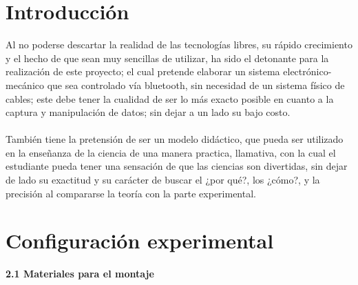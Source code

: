 \documentclass[12]{article}
\begin{document}
\begin{multicols}{2}
\section{Introducción}
Al no poderse descartar la realidad de las tecnologías libres, su rápido crecimiento y el hecho de que sean muy sencillas de utilizar, ha sido el detonante para la realización de este proyecto; el cual pretende elaborar un sistema electrónico-mecánico que sea controlado vía bluetooth, sin necesidad de un sistema físico de cables; este debe tener la cualidad de ser lo más exacto posible en cuanto a la captura y manipulación de datos; sin dejar a un lado su bajo costo. \\\\ También tiene la pretensión de ser un modelo didáctico, que pueda ser utilizado en la enseñanza de la ciencia de una manera practica, llamativa, con la cual el estudiante pueda tener una sensación de que las ciencias son divertidas, sin dejar de lado su exactitud y su carácter de buscar el ¿por qué?,  los ¿cómo?, y la precisión al compararse la teoría con la parte experimental.

\section{Configuración experimental}

{\bf{2.1 Materiales para el montaje}} \\


\end{multicols}
\end{document}
